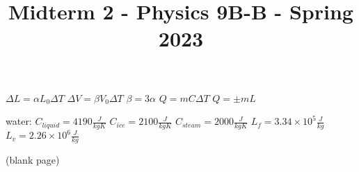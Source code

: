 \documentclass{exam}
\begin{document}
$\Delta L = \alpha L_0 \Delta T$
$\Delta V = \beta V_0 \Delta T$
$\beta=3\alpha$
$Q=m C \Delta T$
$Q=\pm mL$


water: $C_{liquid}=4190\frac{J}{kgK}$
$C_{ice}=2100\frac{J}{kgK}$
$C_{steam}=2000\frac{J}{kgK}$
$L_f=3.34\times10^5 \frac{J}{kg}$
$L_v=2.26\times10^6 \frac{J}{kg}$

\newpage
\centering(blank page)
\newpage




\title{Midterm 2 - Physics 9B-B - Spring 2023}
\author{}
\date{}
\maketitle





\vspace{20mm}

\vspace{10mm}
\newpage
\end{document}
